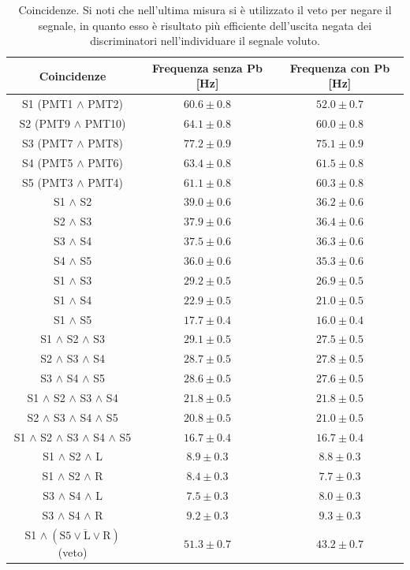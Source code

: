 \documentclass[11pt, oneside, a4paper]{article}   	%
\begin{document}
\begin{table}[H]
	\centering
	\begin{tabular}{ccc}
		\toprule
		Coincidenze						&	Frequenza senza Pb [Hz] & Frequenza con Pb [Hz]	\\
		\midrule
		S1 (PMT1 $\wedge$ PMT2)					& $60.6 \pm 0.8$	& $52.0 \pm 0.7$ \\
		S2 (PMT9 $\wedge$ PMT10)				& $64.1 \pm 0.8$	& $60.0 \pm 0.8$ \\
		S3 (PMT7 $\wedge$ PMT8)					& $77.2 \pm 0.9$	& $75.1 \pm 0.9$ \\
		S4 (PMT5 $\wedge$ PMT6)					& $63.4 \pm 0.8$	& $61.5 \pm 0.8$ \\
		S5 (PMT3 $\wedge$ PMT4)					& $61.1 \pm 0.8$	& $60.3 \pm 0.8$ \\
		S1 $\wedge$ S2 						& $39.0 \pm 0.6$	& $36.2 \pm 0.6$ \\
		S2 $\wedge$ S3 						& $37.9 \pm 0.6$    	& $36.4 \pm 0.6$ \\
		S3 $\wedge$ S4 						& $37.5 \pm 0.6$	& $36.3 \pm 0.6$ \\
		S4 $\wedge$ S5 						& $36.0 \pm 0.6$	& $35.3 \pm 0.6$ \\
		S1 $\wedge$ S3 						& $29.2 \pm 0.5$	& $26.9 \pm 0.5$ \\
		S1 $\wedge$ S4 						& $22.9 \pm 0.5$	& $21.0 \pm 0.5$ \\
		S1 $\wedge$ S5 						& $17.7 \pm 0.4$	& $16.0 \pm 0.4$ \\
		S1 $\wedge$ S2 $\wedge$ S3				& $29.1 \pm 0.5$	& $27.5 \pm 0.5$ \\
		S2 $\wedge$ S3 $\wedge$ S4				& $28.7 \pm 0.5$	& $27.8 \pm 0.5$ \\
		S3 $\wedge$ S4 $\wedge$ S5				& $28.6 \pm 0.5$	& $27.6 \pm 0.5$ \\
		S1 $\wedge$ S2 $\wedge$ S3 $\wedge$ S4			& $21.8 \pm 0.5$	& $21.8 \pm 0.5$ \\
		S2 $\wedge$ S3 $\wedge$ S4 $\wedge$ S5			& $20.8 \pm 0.5$	& $21.0 \pm 0.5$ \\
		S1 $\wedge$ S2 $\wedge$ S3 $\wedge$ S4 $\wedge$ S5	& $16.7 \pm 0.4$	& $16.7 \pm 0.4$ \\	
		S1 $\wedge$ S2 $\wedge$ L				& $8.9 \pm 0.3$		& $8.8 \pm 0.3$	\\
		S1 $\wedge$ S2 $\wedge$ R				& $8.4 \pm 0.3$		& $7.7 \pm 0.3$	\\
		S3 $\wedge$ S4 $\wedge$ L				& $7.5 \pm 0.3$		& $8.0 \pm 0.3$	\\
		S3 $\wedge$ S4 $\wedge$ R				& $9.2 \pm 0.3$ 	& $9.3 \pm 0.3$	\\
		S1 $\wedge \ (\overline{\mbox{S5}\vee \mbox{L} \vee \mbox{R}})$ (veto)	& $51.3 \pm 0.7$	& $43.2 \pm 0.7$	\\
		\bottomrule
	\end{tabular}
	\caption{Coincidenze. Si noti che nell'ultima misura si è utilizzato il veto per negare il segnale, in quanto esso è risultato più efficiente dell'uscita negata dei discriminatori nell'individuare il segnale voluto.}
	\label{coincidenze}
\end{table}
%
\end{document}
